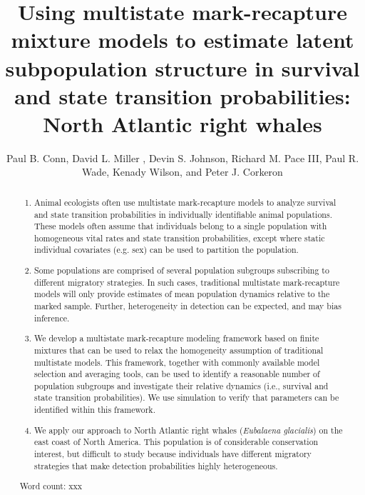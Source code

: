 \documentclass[times,mee,doublespace,]{besauth2}
\begin{document}


\title{Using multistate mark-recapture mixture models to estimate latent subpopulation structure in survival and state transition probabilities: North Atlantic right whales \footnotemark[2]}

\author{Paul B. Conn\corrauth, David L. Miller , Devin S. Johnson, Richard M. Pace III, Paul R. Wade, Kenady Wilson, and Peter J. Corkeron }


\address{Marine Mammal Laboratory, Alaska Fisheries Science Center, National Marine Fisheries Service, NOAA, 7600 Sand Point Way NE, Seattle, WA 98115 USA;  Northeast Fisheries Science Center, National Marine Fisheries Service,
NOAA, 166 Water Street, Woods Hole, MA 02543 USA}


\begin{abstract}
\small
\begin{enumerate}
\item  Animal ecologists often use multistate mark-recapture models to analyze survival and state transition probabilities in individually identifiable animal populations.  These models often assume that individuals belong to a single population with homogeneous vital rates and state transition probabilities, except where static individual covariates (e.g. sex) can be used to partition the population.

\item Some populations are comprised of several population subgroups subscribing to different migratory strategies.  In such cases, traditional multistate mark-recapture models will only provide estimates of mean population dynamics relative to the marked sample.  Further, heterogeneity in detection can be expected, and may bias inference.

\item We develop a multistate mark-recapture modeling framework based on finite mixtures that can be used to relax the homogeneity assumption of traditional multistate models.  This framework, together with commonly available model selection and averaging tools, can be used to identify a reasonable number of population subgroups and investigate their relative dynamics (i.e., survival and state transition probabilities).  We use simulation to verify that parameters can be identified within this framework.

\item We apply our approach to North Atlantic right whales (\textit{Eubalaena glacialis}) on the east coast of North America. This population is of considerable conservation interest, but difficult to study because individuals have different migratory strategies that make detection probabilities highly heterogeneous.

\end{enumerate}


 Word count: xxx
\end{abstract}
\end{document}
